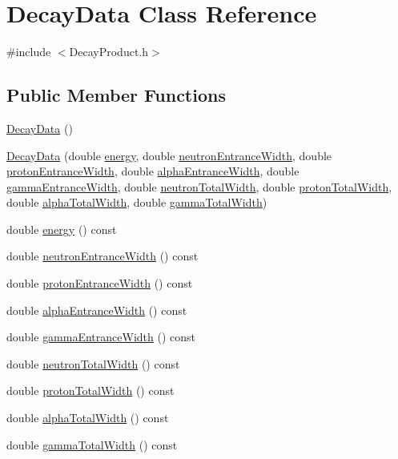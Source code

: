\hypertarget{classDecayData}{\section{Decay\-Data Class Reference}
\label{classDecayData}
}


{\ttfamily \#include $<$Decay\-Product.\-h$>$}

\subsection*{Public Member Functions}
\begin{DoxyCompactItemize}
\item 
\hyperlink{classDecayData_a87af0d8f3ea5bdbdae25a3df6466b961}{Decay\-Data} ()
\item 
\hyperlink{classDecayData_ab0952281d9abcc3ca926878ca22cf3c3}{Decay\-Data} (double \hyperlink{classDecayData_ad69fc37e90b8474081b30df713a05827}{energy}, double \hyperlink{classDecayData_ad43a56a0f73b050d3d7ed1f57e7a5162}{neutron\-Entrance\-Width}, double \hyperlink{classDecayData_ad7aace1268c96f54454646dbed171cb9}{proton\-Entrance\-Width}, double \hyperlink{classDecayData_a8a189015abb0d654b2d66bab05c628bb}{alpha\-Entrance\-Width}, double \hyperlink{classDecayData_a48430972ecd39df296a309c42ed97069}{gamma\-Entrance\-Width}, double \hyperlink{classDecayData_a1c4708e2cb37c42b5f6a9336f6baeb5b}{neutron\-Total\-Width}, double \hyperlink{classDecayData_a4292296d0151c831e1e5067da25ebc46}{proton\-Total\-Width}, double \hyperlink{classDecayData_a9ab5e2e8be60d866404d5f00baaa3f39}{alpha\-Total\-Width}, double \hyperlink{classDecayData_a8f93cdeaf61fb0ac451b10b9c7af354a}{gamma\-Total\-Width})
\item 
double \hyperlink{classDecayData_ad69fc37e90b8474081b30df713a05827}{energy} () const 
\item 
double \hyperlink{classDecayData_ad43a56a0f73b050d3d7ed1f57e7a5162}{neutron\-Entrance\-Width} () const 
\item 
double \hyperlink{classDecayData_ad7aace1268c96f54454646dbed171cb9}{proton\-Entrance\-Width} () const 
\item 
double \hyperlink{classDecayData_a8a189015abb0d654b2d66bab05c628bb}{alpha\-Entrance\-Width} () const 
\item 
double \hyperlink{classDecayData_a48430972ecd39df296a309c42ed97069}{gamma\-Entrance\-Width} () const 
\item 
double \hyperlink{classDecayData_a1c4708e2cb37c42b5f6a9336f6baeb5b}{neutron\-Total\-Width} () const 
\item 
double \hyperlink{classDecayData_a4292296d0151c831e1e5067da25ebc46}{proton\-Total\-Width} () const 
\item 
double \hyperlink{classDecayData_a9ab5e2e8be60d866404d5f00baaa3f39}{alpha\-Total\-Width} () const 
\item 
double \hyperlink{classDecayData_a8f93cdeaf61fb0ac451b10b9c7af354a}{gamma\-Total\-Width} () const 
\end{DoxyCompactItemize}


